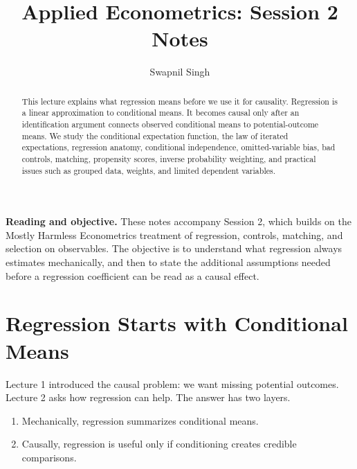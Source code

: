 

\title{Applied Econometrics: Session 2 Notes}
\author{Swapnil Singh}
\date{}


\setlength{\headheight}{26pt}


\maketitle

\begin{abstract}
This lecture explains what regression means before we use it for causality.
Regression is a linear approximation to conditional means. It becomes causal
only after an identification argument connects observed conditional means to
potential-outcome means. We study the conditional expectation function, the law
of iterated expectations, regression anatomy, conditional independence,
omitted-variable bias, bad controls, matching, propensity scores, inverse
probability weighting, and practical issues such as grouped data, weights, and
limited dependent variables.
\end{abstract}

\begin{boxD}
\textbf{Reading and objective.} These notes accompany Session 2, which builds
on the Mostly Harmless Econometrics treatment of regression, controls, matching,
and selection on observables. The objective is to understand what regression
always estimates mechanically, and then to state the additional assumptions
needed before a regression coefficient can be read as a causal effect.
\end{boxD}

\section{Regression Starts with Conditional Means}

Lecture 1 introduced the causal problem: we want missing potential outcomes.
Lecture 2 asks how regression can help. The answer has two layers.
\begin{enumerate}
    \item Mechanically, regression summarizes conditional means.
    \item Causally, regression is useful only if conditioning creates credible
    comparisons.
\end{enumerate}

